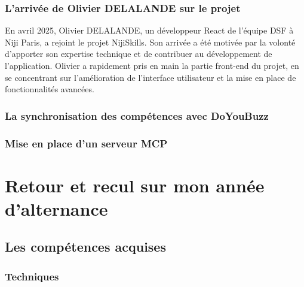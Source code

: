 \documentclass[12pt]{article}
\begin{document}
\subsubsection{L'arrivée de Olivier DELALANDE sur le projet}
En avril 2025, Olivier DELALANDE, un développeur React de l'équipe DSF à Niji Paris, a rejoint le projet NijiSkills. Son arrivée a été motivée par la volonté d'apporter son expertise technique et de contribuer au développement de l'application. Olivier a rapidement pris en main la partie front-end du projet, en se concentrant sur l'amélioration de l'interface utilisateur et la mise en place de fonctionnalités avancées.
\subsubsection{La synchronisation des compétences avec DoYouBuzz}
\subsubsection{Mise en place d'un serveur MCP}

\section{Retour et recul sur mon année d'alternance}
\subsection{Les compétences acquises}
\subsubsection{Techniques}
\subsubsection{}
\end{document}

